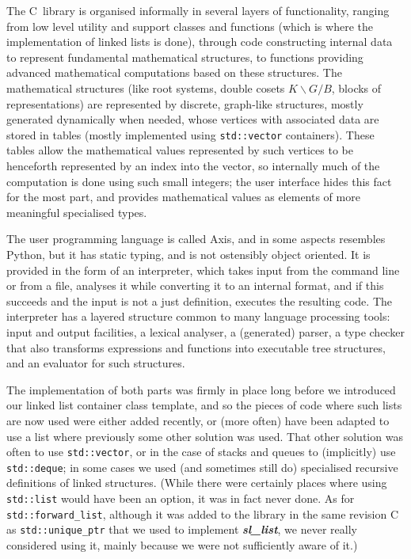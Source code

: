 \documentclass[12pt]{article}
\theoremstyle{plain}
\theoremstyle{definition}
\def\PP{\copy\PPbox}
\newcommand\Cee{\textsc{C}}
\newcommand\Cpp{\Cee\PP}
\newcommand\std[1]{\texttt{std::#1}}
\def\frwl.{\std{forward\_list}}
\def\vect.{\std{vector}}
\def\slls.{\textbf{\textit{sl\_\!list}}}
\begin{document}
The \Cpp\ library is organised informally in several layers of functionality,
ranging from low level utility and support classes and functions (which is where
the implementation of linked lists is done), through code constructing internal
data to represent fundamental mathematical structures, to functions providing
advanced mathematical computations based on these structures. The mathematical
structures (like root systems, double cosets $K\backslash G/B$, blocks of
representations) are represented by discrete, graph-like structures, mostly
generated dynamically when needed, whose vertices with associated data are
stored in tables (mostly implemented using \vect. containers). These
tables allow the mathematical values represented by such vertices to be
henceforth represented by an index into the vector, so internally much of the
computation is done using such small integers; the user interface hides this
fact for the most part, and provides mathematical values as elements of more
meaningful specialised types.

The user programming language is called Axis, and in some aspects resembles
Python, but it has static typing, and is not ostensibly object oriented. It is
provided in the form of an interpreter, which takes input from the command line
or from a file, analyses it while converting it to an internal format, and if
this succeeds and the input is not a just definition, executes the resulting
code. The interpreter has a layered structure common to many language processing
tools: input and output facilities, a lexical analyser, a (generated) parser, a
type checker that also transforms expressions and functions into executable tree
structures, and an evaluator for such structures.

The implementation of both parts was firmly in place long before we introduced
our linked list container class template, and so the pieces of code where such
lists are now used were either added recently, or (more often) have been adapted
to use a list where previously some other solution was used. That other solution
was often to use \vect., or in the case of stacks and queues to
(implicitly) use \std{deque}; in some cases we used (and sometimes still do)
specialised recursive definitions of linked structures. (While there were
certainly places where using \std{list} would have been an option, it was in
fact never done. As for \frwl., although it was added to the library in the same
revision \Cpp11 as \std{unique\_\!ptr} that we used to implement \slls., we
never really considered using it, mainly because we were not sufficiently aware
of it.)
\end{document}
